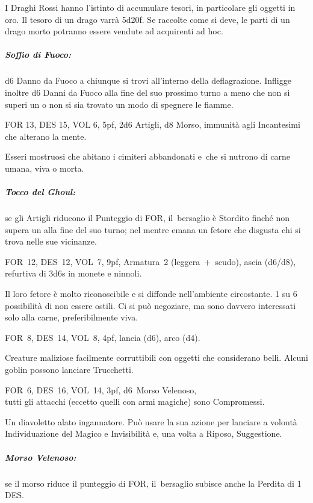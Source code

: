\documentclass[itdr]{subfiles}
\begin{document}
I Draghi Rossi hanno l'istinto di accumulare tesori, in particolare gli oggetti in oro. Il tesoro di un drago varrà 5d20f. Se raccolte come si deve, le parti di un drago morto potranno essere vendute ad acquirenti ad hoc.

\subparagraph{Soffio di Fuoco:} d6 Danno da Fuoco a chiunque si trovi all'interno della deflagrazione. Infligge inoltre d6 Danni da Fuoco alla fine del suo prossimo turno a meno che non si superi un  o non si sia trovato un modo di spegnere le fiamme.

\break

FOR 13, DES 15, VOL 6, 5pf, 2d6 Artigli, d8 Morso, \mbox{immunità} agli Incantesimi che alterano la mente.

Esseri mostruosi che abitano i cimiteri abbandonati e~che si nutrono di carne umana, viva o morta.

\subparagraph{Tocco del Ghoul:} se gli Artigli riducono il Punteggio di FOR, \mbox{il bersaglio} è Stordito finché non supera un  alla fine del suo turno; nel mentre emana un fetore che disgusta chi si trova nelle sue vicinanze.

\vfill

FOR~12, DES~12, VOL~7, 9pf, Armatura~2 \mbox{(leggera + scudo),} ascia (d6/d8), refurtiva di 3d6s in monete e ninnoli.

Il loro fetore è molto riconoscibile e si diffonde nell'ambiente circostante.
1 su 6 possibilità di non essere ostili. Ci si può negoziare, ma sono davvero interessati solo alla carne, preferibilmente viva.

\vfill

FOR~8, DES~14, VOL~8, 4pf, lancia (d6), arco (d4).

Creature maliziose facilmente corruttibili con oggetti che considerano belli. Alcuni goblin possono lanciare Trucchetti.

\vfill

FOR~6, DES~16, VOL~14, 3pf, d6~Morso Velenoso,\\tutti gli attacchi (eccetto quelli con armi magiche) sono Compromessi.

Un diavoletto alato ingannatore. Può usare la sua azione per lanciare a volontà Individuazione del Magico e Invisibilità e, una volta a Riposo, Suggestione.

\subparagraph{Morso Velenoso:} se il morso riduce il punteggio di FOR, \mbox{il bersaglio} subisce anche la Perdita di 1 DES.
\end{document}
